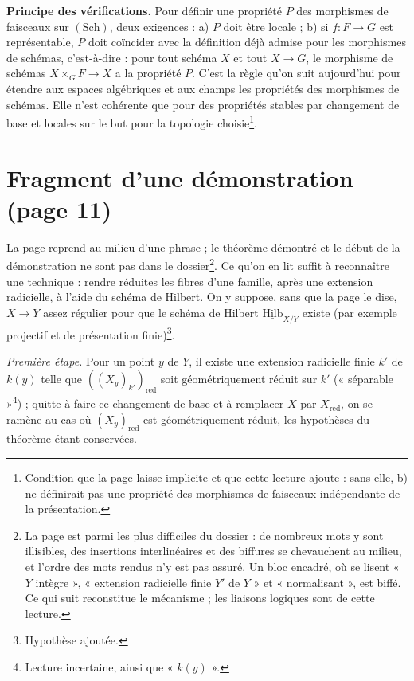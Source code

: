 \documentclass[11pt,a4paper]{article}
\begin{document}
\textbf{Principe des vérifications.} Pour définir une propriété $P$ des
morphismes de faisceaux sur $(\mathrm{Sch})$, deux exigences : a) $P$ doit être
locale ; b) si $f : F \to G$ est représentable, $P$ doit coïncider avec la
définition déjà admise pour les morphismes de schémas, c'est-à-dire : pour tout
schéma $X$ et tout $X \to G$, le morphisme de schémas $X \times_G F \to X$ a la
propriété $P$. C'est la règle qu'on suit aujourd'hui pour étendre aux espaces
algébriques et aux champs les propriétés des morphismes de schémas. Elle n'est
cohérente que pour des propriétés stables par changement de base et locales
sur le but pour la topologie choisie\footnote{Condition que la page laisse
implicite et que cette lecture ajoute : sans elle, b) ne définirait pas une
propriété des morphismes de faisceaux indépendante de la présentation.}.

\section*{Fragment d'une démonstration (page 11)}

La page reprend au milieu d'une phrase ; le théorème démontré et le début de
la démonstration ne sont pas dans le dossier\footnote{La page est parmi les plus
difficiles du dossier : de nombreux mots y sont illisibles, des insertions
interlinéaires et des biffures se chevauchent au milieu, et l'ordre des mots
rendus n'y est pas assuré. Un bloc encadré, où se lisent « $Y$ intègre »,
« extension radicielle finie $Y'$ de $Y$ » et « normalisant », est biffé.
Ce qui suit reconstitue le mécanisme ; les liaisons logiques sont de cette
lecture.}. Ce qu'on en lit suffit à reconnaître une technique : rendre réduites
les fibres d'une famille, après une extension radicielle, à l'aide du schéma de
Hilbert. On y suppose, sans que la page le dise, $X \to Y$ assez régulier pour
que le schéma de Hilbert $\underline{\mathrm{Hilb}}_{X/Y}$ existe (par exemple
projectif et de présentation finie)\footnote{Hypothèse ajoutée.}.

\emph{Première étape.} Pour un point $y$ de $Y$, il existe une extension
radicielle finie $k'$ de $k(y)$ telle que $((X_y)_{k'})_{\mathrm{red}}$ soit
géométriquement réduit sur $k'$ (« séparable »\footnote{Lecture incertaine,
ainsi que « $k(y)$ ».}) ; quitte à faire ce changement de base et à remplacer $X$
par $X_{\mathrm{red}}$, on se ramène au cas où $(X_y)_{\mathrm{red}}$ est
géométriquement réduit, les hypothèses du théorème étant conservées.
\end{document}
